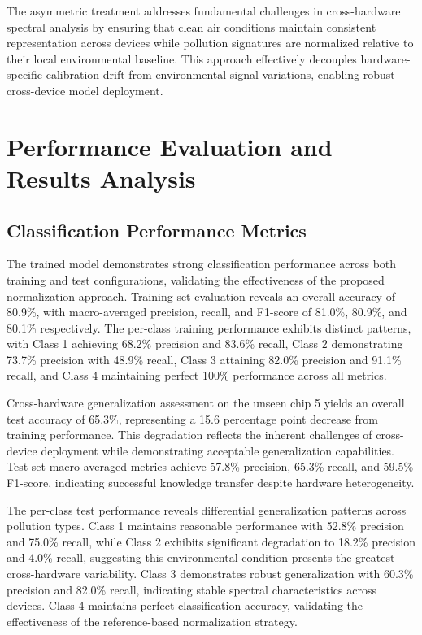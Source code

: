 The asymmetric treatment addresses fundamental challenges in cross-hardware spectral analysis by ensuring that clean air conditions maintain consistent representation across devices while pollution signatures are normalized relative to their local environmental baseline. This approach effectively decouples hardware-specific calibration drift from environmental signal variations, enabling robust cross-device model deployment.

\section{Performance Evaluation and Results Analysis}

\subsection{Classification Performance Metrics}

The trained model demonstrates strong classification performance across both training and test configurations, validating the effectiveness of the proposed normalization approach. Training set evaluation reveals an overall accuracy of 80.9\%, with macro-averaged precision, recall, and F1-score of 81.0\%, 80.9\%, and 80.1\% respectively. The per-class training performance exhibits distinct patterns, with Class 1 achieving 68.2\% precision and 83.6\% recall, Class 2 demonstrating 73.7\% precision with 48.9\% recall, Class 3 attaining 82.0\% precision and 91.1\% recall, and Class 4 maintaining perfect 100\% performance across all metrics.

Cross-hardware generalization assessment on the unseen chip 5 yields an overall test accuracy of 65.3\%, representing a 15.6 percentage point decrease from training performance. This degradation reflects the inherent challenges of cross-device deployment while demonstrating acceptable generalization capabilities. Test set macro-averaged metrics achieve 57.8\% precision, 65.3\% recall, and 59.5\% F1-score, indicating successful knowledge transfer despite hardware heterogeneity.

The per-class test performance reveals differential generalization patterns across pollution types. Class 1 maintains reasonable performance with 52.8\% precision and 75.0\% recall, while Class 2 exhibits significant degradation to 18.2\% precision and 4.0\% recall, suggesting this environmental condition presents the greatest cross-hardware variability. Class 3 demonstrates robust generalization with 60.3\% precision and 82.0\% recall, indicating stable spectral characteristics across devices. Class 4 maintains perfect classification accuracy, validating the effectiveness of the reference-based normalization strategy.

